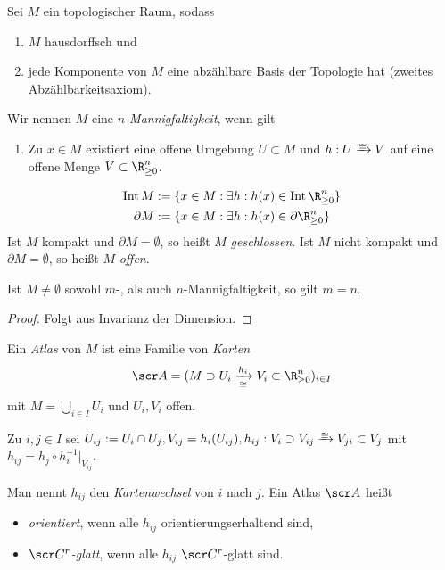 \begin{df}
	Sei $M$ ein topologischer Raum, sodass
	\begin{enumerate}[1)]
		\item
			$M$ hausdorffsch und
		\item
			jede Komponente von $M$ eine abzählbare Basis der Topologie hat (zweites Abzählbarkeitsaxiom).
	\end{enumerate}
	Wir nennen $M$ eine \emph{$n$-Mannigfaltigkeit}, wenn gilt
	\begin{enumerate}[1),resume]
		\item
			Zu $x \in M$ existiert eine offene Umgebung $U \subset M$ und $h: U \homeomorphicto V$ auf eine offene Menge $V \subset \R_{\ge 0}^n$.
	\end{enumerate}
	\begin{align*}
		\Int M &:= \{ x \in M : \exists h: h(x) \in \Int \R_{\ge 0}^n \} \\
		\boundary M &:= \{ x \in M : \exists h: h(x) \in \boundary \R_{\ge 0}^n \}
	\end{align*}
	Ist $M$ kompakt und $\partial M = \emptyset$, so heißt $M$ \emph{geschlossen}.
	Ist $M$ nicht kompakt und $\partial M = \emptyset$, so heißt $M$ \emph{offen}.
\end{df}

\begin{st}
	Ist $M \neq \emptyset$ sowohl $m$-, als auch $n$-Mannigfaltigkeit, so gilt $m = n$.
	\begin{proof}
		Folgt aus Invarianz der Dimension.
	\end{proof}
\end{st}

\begin{df}
	Ein \emph{Atlas} von $M$ ist eine Familie von \emph{Karten}
	\[
		\scr A = (M \supset U_i \xrightarrow[\homeomorphic]{h_i} V_i \subset \R_{\ge 0}^n)_{i\in I}
	\]
	mit $M = \bigcup_{i \in I} U_i$ und $U_i, V_i$ offen.

	Zu $i,j \in I$ sei $U_{ij} := U_i \cap U_j, V_{ij} = h_i(U_{ij}), h_{ij} : V_i \supset V_{ij} \homeomorphicto V_{ji} \subset V_j$ mit $h_{ij} = h_j \circ h_i^{-1}|_{V_{ij}}$.

	Man nennt $h_{ij}$ den \emph{Kartenwechsel} von $i$ nach $j$.
	Ein Atlas $\scr A$ heißt
	\begin{itemize}
		\item
			\emph{orientiert}, wenn alle $h_{ij}$ orientierungserhaltend sind,
		\item
			\emph{$\scr C^r$-glatt}, wenn alle $h_{ij}$ $\scr C^r$-glatt sind.
	\end{itemize}
\end{df}


